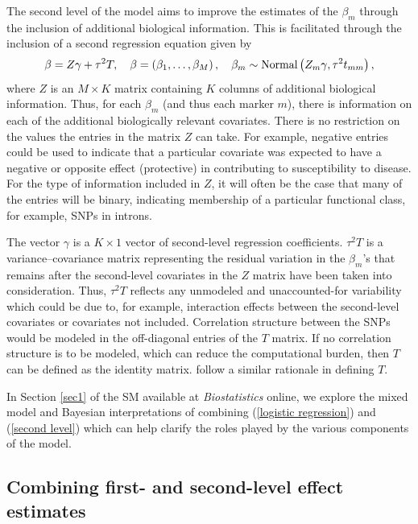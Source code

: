 The second level of the model aims to improve the estimates
of the $\beta_m$ through the inclusion of additional biological
information. This is facilitated through the inclusion of
a second regression equation given by
\begin{equation}
\beta = Z \gamma + \tau^2 T,
\quad
\beta = \left( \beta_1, \ldots, \beta_M \right),
\quad
\beta_m \sim \hbox{Normal} \left( Z_m \gamma, \tau^2 t_{mm} \right),
\label{second level}
\end{equation}
where $Z$ is an $M \times K$ matrix containing $K$ columns of
additional biological information. Thus, for each $\beta_m$
(and thus each marker $m$), there is information on each of
the additional biologically relevant covariates. There is no
restriction on the values the entries in the matrix $Z$ can
take. For example, negative entries could be used to indicate
that a particular covariate was expected to have a negative
or opposite effect (protective) in contributing to
susceptibility to disease. For the type of information
included in $Z$, it will often be the case that many of the
entries will be binary, indicating membership of a particular
functional class, for example, SNPs in introns.

The vector $\gamma$ is a $K \times 1$ vector of second-level
regression coefficients. $\tau^2 T$ is a variance--covariance
matrix representing the residual variation in the $\beta_m$'s
that remains after the second-level covariates in the $Z$ matrix
have been taken into consideration. Thus, $\tau^2 T$ reflects
any unmodeled and unaccounted-for variability which could be due
to, for example, interaction effects between the second-level
covariates or covariates not included. Correlation structure
between the SNPs would be modeled in the off-diagonal entries of
the $T$ matrix. If no correlation structure is to be modeled,
which can reduce the computational burden, then $T$ can be
defined as the identity matrix.
\citet{tomlins2005}
follow a similar rationale in defining $T$.

In Section \ref{sec1} of the SM available at
\textit{Biostatistics} online, we explore the mixed model
and Bayesian interpretations of combining (\ref{logistic regression})
and (\ref{second level}) which can help clarify the roles played by
the various components of the model.


\subsection{Combining first- and second-level effect estimates}

